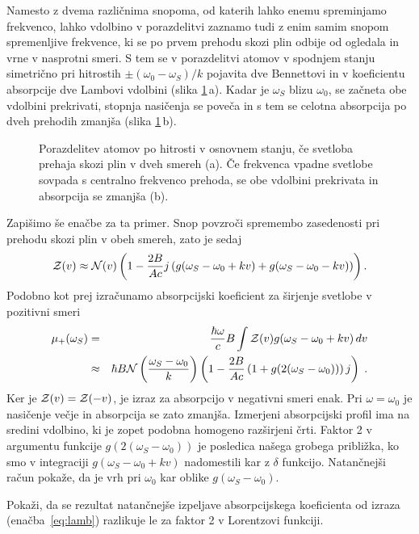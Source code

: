 Namesto z dvema različnima snopoma, od katerih lahko enemu spreminjamo
frekvenco, lahko vdolbino v porazdelitvi zaznamo tudi z enim samim snopom
spremenljive frekvence, ki se po prvem prehodu skozi plin odbije od
ogledala in vrne v nasprotni smeri. S tem se v porazdelitvi atomov
v spodnjem stanju simetrično pri hitrostih $\pm(\omega_{0}-\omega_S)/k$
pojavita dve Bennettovi in v koeficientu absorpcije
dve Lambovi vdolbini (slika \ref{fig:Lamb}\,a).
Kadar je $\omega_S$ blizu $\omega_{0}$, se začneta obe vdolbini prekrivati, 
stopnja nasičenja se poveča in s tem se celotna absorpcija po dveh 
prehodih zmanjša (slika \ref{fig:Lamb}\,b).
\begin{figure}[h]
\centering
\def\svgwidth{140truemm} 

\caption{Porazdelitev atomov po hitrosti v osnovnem stanju, če svetloba prehaja 
skozi plin v dveh smereh (a). Če frekvenca vpadne svetlobe sovpada s centralno 
frekvenco prehoda, se obe vdolbini prekrivata in absorpcija se zmanjša (b).}
\label{fig:Lamb}
\end{figure}

Zapišimo še enačbe za ta primer. Snop povzroči spremembo zasedenosti
pri prehodu skozi plin v obeh smereh, zato je sedaj 
\begin{equation}
{\cal Z}(v)\approx{\cal N}(v)\left(1-\frac{2B}{Ac}j\left(g(\omega_S-\omega_{0}+kv)+
g(\omega_S-\omega_{0}-kv)\right)\right).
\label{4.92}
\end{equation}
Podobno kot prej izračunamo absorpcijski koeficient za širjenje svetlobe v
pozitivni smeri 
\begin{eqnarray}
\mu_{+}(\omega_S) & = & \frac{\hbar\omega}{c}B\int{\cal Z}(v)g(\omega_S-\omega_{0}+kv)\, dv\nonumber \\
 & \approx & \hbar B{\cal N}\left(\frac{\omega_S-\omega_0}{k}\right)\left(1-\frac{2B}{Ac}\left(1+g(2(\omega_S-\omega_{0}))\right)j\right)\;.
 \label{eq:lamb}
\end{eqnarray}
 Ker je ${\cal Z}(v)={\cal Z}(-v)$, je izraz za absorpcijo v negativni
smeri enak. Pri $\omega=\omega_{0}$ je nasičenje večje in absorpcija
se zato zmanjša. Izmerjeni absorpcijski profil ima na sredini vdolbino,
ki je zopet podobna homogeno razširjeni črti. Faktor 2 v argumentu
funkcije $g(2(\omega_S-\omega_{0}))$ je posledica našega grobega približka,
ko smo v integraciji $g(\omega_S-\omega_{0}+kv)$ nadomestili kar z
$\delta$ funkcijo. Natančnejši račun pokaže, da je vrh pri $\omega_{0}$
kar oblike $g(\omega_S-\omega_{0})$.

\begin{definition}
Pokaži, da se rezultat natančnejše izpeljave absorpcijskega koeficienta  
od izraza (enačba~\ref{eq:lamb}) razlikuje le za faktor 2 v Lorentzovi funkciji.
\end{definition}

